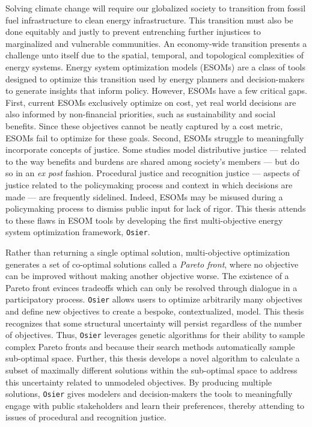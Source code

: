 Solving climate change will require our globalized society to transition from
fossil fuel infrastructure to clean energy infrastructure. This transition must
also be done equitably and justly to prevent entrenching further injustices to
marginalized and vulnerable communities. An economy-wide transition presents a
challenge unto itself due to the spatial, temporal, and topological complexities
of energy systems. Energy system optimization models (ESOMs) are a class of
tools designed to optimize this transition used by energy planners and
decision-makers to generate insights that inform policy. However, ESOMs have a
few critical gaps. First, current ESOMs exclusively optimize on cost, yet real
world decisions are also informed by non-financial priorities, such as
sustainability and social benefits. Since these objectives cannot be neatly
captured by a cost metric, ESOMs fail to optimize for these goals. Second, ESOMs
struggle to meaningfully incorporate concepts of justice. Some studies model
distributive justice --- related to the way benefits and burdens are shared
among society's members --- but do so in an \textit{ex post} fashion. Procedural
justice and recognition justice --- aspects of justice related to the
policymaking process and context in which decisions are made --- are frequently
sidelined. Indeed, ESOMs may be misused during a policymaking process to dismiss
public input for lack of rigor. This thesis attends to these flaws in ESOM tools
by developing the first multi-objective energy system optimization framework,
\texttt{Osier}.

Rather than returning a single optimal solution, multi-objective optimization
generates a set of co-optimal solutions called a \textit{Pareto front}, where no
objective can be improved without making another objective worse. The existence
of a Pareto front evinces tradeoffs which can only be resolved through dialogue
in a participatory process. \texttt{Osier} allows users to optimize arbitrarily
many objectives and define new objectives to create a bespoke, contextualized,
model. This thesis recognizes that some structural uncertainty will persist
regardless of the number of objectives. Thus, \texttt{Osier} leverages genetic
algorithms for their ability to sample complex Pareto fronts and because their
search methods automatically sample sub-optimal space. Further, this thesis
develops a novel algorithm to calculate a subset of maximally different
solutions within the sub-optimal space to address this uncertainty related to
unmodeled objectives. By producing multiple solutions, \texttt{Osier} gives
modelers and decision-makers the tools to meaningfully engage with public
stakeholders and learn their preferences, thereby attending to issues of
procedural and recognition justice.

